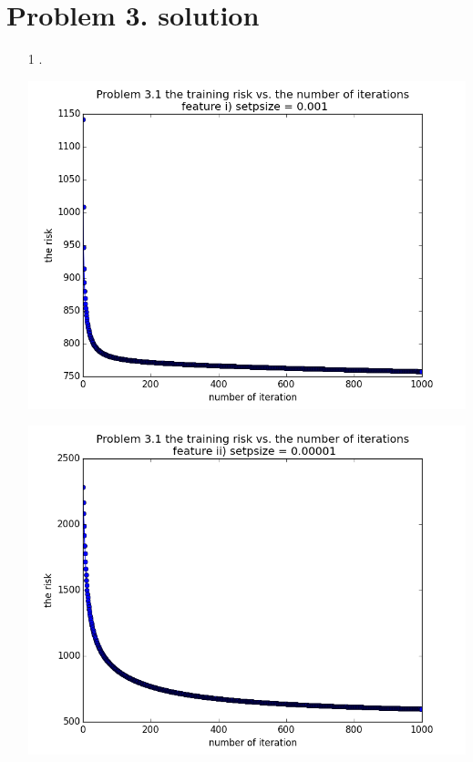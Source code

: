 \documentclass[11pt]{article}
\begin{document}
\section*{Problem 3. solution}
\begin{itemize}

\item[1].

\includegraphics[scale=0.6]{5}

\includegraphics[scale=0.6]{6}


\end{itemize}
\end{document}
